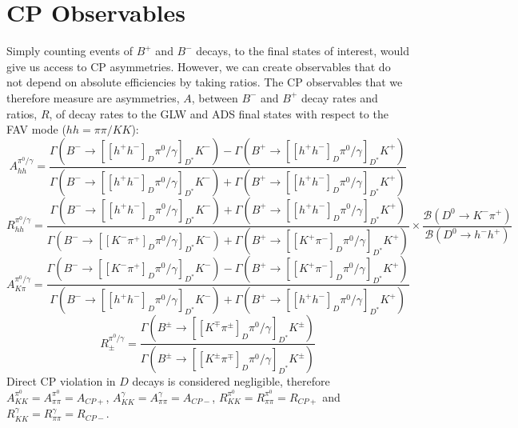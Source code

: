 \documentclass[oneside,12pt]{article}
\begin{document}
\section{\normalsize CP Observables} Simply counting events of $B^{+}$ and
$B^{-}$ decays, to the final states of interest, would give us access to CP
asymmetries. However, we can create observables that do not depend on absolute
efficiencies by taking ratios. The CP observables that we therefore measure are
asymmetries, $A$, between $B^{-}$ and $B^{+}$ decay rates and ratios, $R$, of
decay rates to the GLW and ADS final states with respect to the FAV mode
($hh=\pi \pi /KK$):
  \begin{equation}
    A_{hh}^{\pi^{0}/\gamma}=\frac{\Gamma(B^{-}\rightarrow
    [[h^{+}h^{-}]_{D}\pi^{0}/\gamma]_{D^{*}}K^{-})-\Gamma(B^{+}\rightarrow
    [[h^{+}h^{-}]_{D}\pi^{0}/\gamma]_{D^{*}}K^{+})}{\Gamma(B^{-}\rightarrow
    [[h^{+}h^{-}]_{D}\pi^{0}/\gamma]_{D^{*}}K^{-})+\Gamma(B^{+}\rightarrow
    [[h^{+}h^{-}]_{D}\pi^{0}/\gamma]_{D^{*}}K^{+})} \label{eq:Aglw}
  \end{equation}
  \begin{equation}
    R_{hh}^{\pi^{0}/\gamma}=\frac{\Gamma(B^{-}\rightarrow
    [[h^{+}h^{-}]_{D}\pi^{0}/\gamma]_{D^{*}}K^{-})+\Gamma(B^{+}\rightarrow
    [[h^{+}h^{-}]_{D}\pi^{0}/\gamma]_{D^{*}}K^{+})}{\Gamma(B^{-}\rightarrow
    [[K^{-}\pi^{+}]_{D}\pi^{0}/\gamma]_{D^{*}}K^{-})+\Gamma(B^{+}\rightarrow
    [[K^{+}\pi^{-}]_{D}\pi^{0}/\gamma]_{D^{*}}K^{+})} \times
    \frac{\mathcal{B}(D^{0}\rightarrow
    K^{-}\pi^{+})}{\mathcal{B}(D^{0}\rightarrow h^{-}h^{+})} \label{eq:Rglw}
  \end{equation}
  \begin{equation}
    A_{K\pi}^{\pi^{0}/\gamma}=\frac{\Gamma(B^{-}\rightarrow
    [[K^{-}\pi^{+}]_{D}\pi^{0}/\gamma]_{D^{*}}K^{-})-\Gamma(B^{+}\rightarrow
    [[K^{+}\pi^{-}]_{D}\pi^{0}/\gamma]_{D^{*}}K^{+})}{\Gamma(B^{-}\rightarrow
    [[h^{+}h^{-}]_{D}\pi^{0}/\gamma]_{D^{*}}K^{-})+\Gamma(B^{+}\rightarrow
    [[h^{+}h^{-}]_{D}\pi^{0}/\gamma]_{D^{*}}K^{+})} \label{eq:Afav}
  \end{equation}
  \begin{equation}
    R_{\pm}^{\pi^{0}/\gamma}=\frac{\Gamma(B^{\pm}\rightarrow
    [[K^{\mp}\pi^{\pm}]_{D}\pi^{0}/\gamma]_{D^{*}}K^{\pm})}{\Gamma(B^{\pm}\rightarrow
    [[K^{\pm}\pi^{\mp}]_{D}\pi^{0}/\gamma]_{D^{*}}K^{\pm})} \label{eq:Rads}
  \end{equation}
\noindent Direct CP violation in $D$ decays is considered negligible, therefore
$A_{KK}^{\pi^{0}}=A_{\pi\pi}^{\pi^{0}}=A_{CP+}$,
$A_{KK}^{\gamma}=A_{\pi\pi}^{\gamma}=A_{CP-}$,
$R_{KK}^{\pi^{0}}=R_{\pi\pi}^{\pi^{0}}=R_{CP+}$ and
$R_{KK}^{\gamma}=R_{\pi\pi}^{\gamma}=R_{CP-}$.
\end{document}
